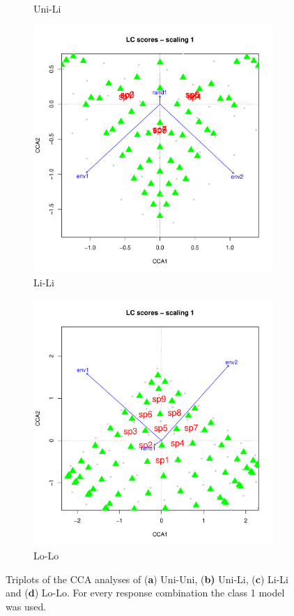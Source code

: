 \begin{figure}[h]
\begin{subfigure}{0.5\textwidth}
				\caption{Uni-Li}
			\end{subfigure}
			\begin{subfigure}{0.5\textwidth}	
				\centering	
				\includegraphics[width=.8\linewidth]{"../02_Figures/CCASM3"}
				\caption{Li-Li}
			\end{subfigure}
			\begin{subfigure}{0.5\textwidth}		
				\centering
				\includegraphics[width=.8\linewidth]{"../02_Figures/CCASM4"}
				\caption{Lo-Lo}
			\end{subfigure}
			
			\caption{Triplots of the CCA analyses of (\textbf{a}) Uni-Uni, (\textbf{b)} Uni-Li, (\textbf{c}) Li-Li and (\textbf{d}) Lo-Lo. For every response combination the class 1 model was used.}
			\label{fig:smccaord}
		
		\end{figure}
